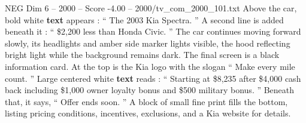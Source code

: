 \begin{textsample}{NEG Dim 6 – 2000 – Score -4.00 – 2000/tv\_com\_2000\_101.txt}
Above the car, bold white \textbf{text} appears : “ The 2003 Kia Spectra. ” A second line is added beneath it : “ \$2,200 less than Honda Civic. ” The car continues moving forward slowly, its headlights and amber side marker lights visible, the hood reflecting bright light while the background remains dark.
The final screen is a black information card.
At the top is the Kia logo with the slogan “ Make every mile count. ” Large centered white \textbf{text} reads : “ Starting at \$8,235 after \$4,000 cash back including \$1,000 owner loyalty bonus and \$500 military bonus. ” Beneath that, it says, “ Offer ends soon. ” A block of small fine print fills the bottom, listing pricing conditions, incentives, exclusions, and a Kia website for details.

\end{textsample}
